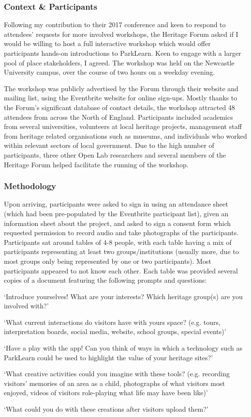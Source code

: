 \subsubsection{Context \& Participants}
Following my contribution to their 2017 conference and keen to respond to attendees' requests for more involved workshops, the Heritage Forum asked if I would be willing to host a full interactive workshop which would offer participants hands-on introductions to ParkLearn. Keen to engage with a larger pool of place stakeholders, I agreed. The workshop was held on the Newcastle University campus, over the course of two hours on a weekday evening. 

The workshop was publicly advertised by the Forum through their website and mailing list, using the Eventbrite website for online sign-ups. Mostly thanks to the Forum's significant database of contact details, the workshop attracted 48 attendees from across the North of England. Participants included academics from several universities, volunteers at local heritage projects, management staff from heritage related organisations such as museums, and individuals who worked within relevant sectors of local government. Due to the high number of participants, three other Open Lab researchers and several members of the Heritage Forum helped facilitate the running of the workshop.

\subsubsection{Methodology}

Upon arriving, participants were asked to sign in using an attendance sheet (which had been pre-populated by the Eventbrite participant list), given an information sheet about the project, and asked to sign a consent form which requested permission to record audio and take photographs of the participants. Participants sat around tables of 4-8 people, with each table having a mix of participants representing at least two groups/institutions (usually more, due to most groups only being represented by one or two participants). Most participants appeared to not know each other. Each table was provided several copies of a document featuring the following prompts and questions:

\begin{displayquote}
`Introduce yourselves! What are your interests? Which heritage group(s) are you involved with?'

`What current interactions do visitors have with yours space? (e.g. tours, interpretation boards, social media, website, school groups, special events)'

`Have a play with the app! Can you think of ways in which a technology such as ParkLearn could be used to highlight the value of your heritage sites?'

`What creative activities could you imagine with these tools? (e.g. recording visitors' memories of an area as a child, photographs of what visitors most enjoyed, videos of visitors role-playing what life may have been like)'

`What could you do with these creations after visitors upload them?'
\end{displayquote}

